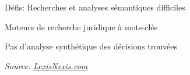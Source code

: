 \documentclass[newPxFont,pagenumber]{beamer}
\begin{document}
\begin{frame}[t]{Défis: Recherches et analyses sémantiques difficiles}

Moteurs de recherche juridique à mots-clés 

Pas d'analyse synthétique des décisions trouvées


\textit{\tiny{Source: \url{LexisNexis.com}}} 
\end{frame}
\end{document}
